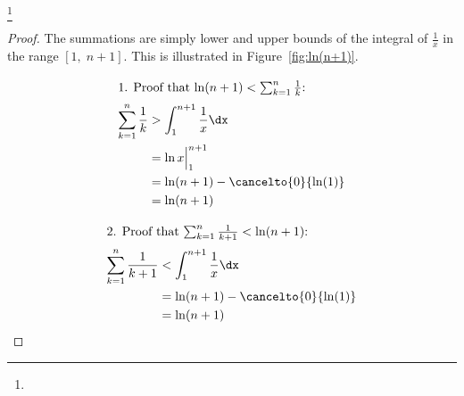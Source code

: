 \begin{theorem}
\footnote{
  }
\end{theorem}
\begin{proof}
The summations are simply lower and upper bounds of the integral
of $\frac{1}{x}$ in the range $[1,\;n+1]$. 
This is illustrated in Figure~\ref{fig:ln(n+1)}.\\
\parbox[t][][t]{\textwidth/2}{
\begin{align*}
\intertext{1. Proof that $\ln(n+1) < \sum_{k=1}^n \frac{1}{k}$:}
  \sum_{k=1}^n \frac{1}{k}
    &> \int_1^{n+1} \frac{1}{x} \dx
  \\&= \ln x \Big|_1^{n+1}
  \\&= \ln(n+1) - \cancelto{0}{\ln(1)} 
  \\&= \ln(n+1)
\end{align*}
}
\parbox[t][][t]{\textwidth/2}{
\begin{align*}
\intertext{2. Proof that $\sum_{k=1}^n \frac{1}{k+1} < \ln(n+1)$:}
  \sum_{k=1}^n \frac{1}{k+1}
    &< \int_1^{n+1} \frac{1}{x} \dx
  \\&= \ln(n+1) - \cancelto{0}{\ln(1)} 
  \\&= \ln(n+1)
\end{align*}
}
\end{proof}


